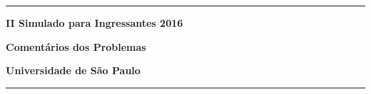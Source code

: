 \documentclass[a4paper,11pt]{article}
\newcommand{\PASTA}{.}
\newcommand{\incluir}[2]{
\renewcommand{\PASTA}{#1}

}
\begin{document}
\begin{center}
\noindent

\hrule

\vspace{3.0cm}

\begin{Huge}
  {\bf II Simulado para Ingressantes 2016}
\end{Huge}

\vspace{8.0cm}

\begin{Huge}
{\bf Comentários dos Problemas}
\end{Huge}

\vspace{8.0cm}

\begin{Large}
  {\bf Universidade de São Paulo}
\end{Large}

\vfill
\hrule
\end{center}


\thispagestyle{empty}

\newpage

\setcounter{letra}{1}
\newcommand{\proxLetra}{\Alph{letra}\stepcounter{letra}}

\incluir{../problemas/ambulatorio/docs}{comentario.tex}
\vspace*{0.5cm}
\incluir{../problemas/aula/docs}{comentario.tex}
\vspace*{0.5cm}
\incluir{../problemas/cinema/docs}{comentario.tex}
\vspace*{0.5cm}
\incluir{../problemas/circular/docs}{comentario.tex}
\vspace*{0.5cm}
\incluir{../problemas/japones/docs}{comentario.tex}
\vspace*{0.5cm}
\incluir{../problemas/karaoke/docs}{comentario.tex}
\vspace*{0.5cm}
\incluir{../problemas/kart/docs}{comentario.tex}
\vspace*{0.5cm}
\incluir{../problemas/nim/docs}{comentario.tex}
\vspace*{0.5cm}
\incluir{../problemas/pablito/docs}{comentario.tex}
\vspace*{0.5cm}
\incluir{../problemas/perdido/docs}{comentario.tex}
\vspace*{0.5cm}
\incluir{../problemas/raia/docs}{comentario.tex}
\vspace*{0.5cm}
\incluir{../problemas/restaurante/docs}{comentario.tex}
\vspace*{0.5cm}
\incluir{../problemas/xadrez/docs}{comentario.tex}
\vspace*{0.5cm}
\end{document}
